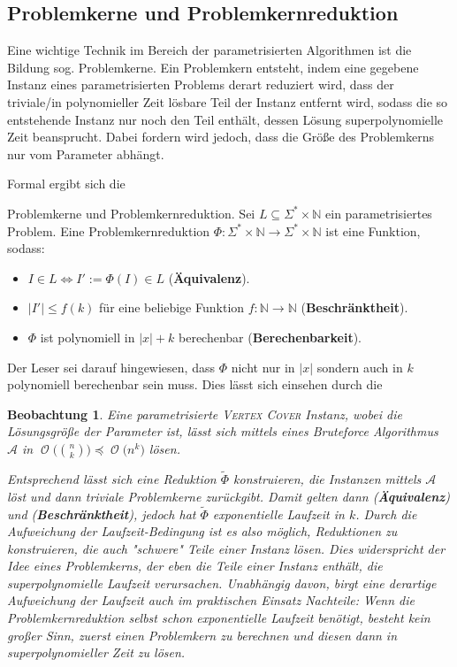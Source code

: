 \documentclass[a4paper,ngerman]{atseminar}
\newcommand{\N}{\ensuremath{\mathbb{N}}\xspace}
\newcommand{\BigO}[1]{\ensuremath{\operatorname{\mathcal{O}}\bigl(#1\bigr)}\xspace}
\newtheorem{observation}[theorem]{\textbf{Beobachtung}}
\begin{document}
\subsection{Problemkerne und Problemkernreduktion}

Eine wichtige Technik im Bereich der parametrisierten Algorithmen ist die Bildung sog. Problemkerne.
Ein Problemkern entsteht, indem eine gegebene Instanz eines parametrisierten Problems derart reduziert wird, dass der triviale/in polynomieller Zeit lösbare
Teil der Instanz entfernt wird, sodass die so entstehende Instanz nur noch den Teil enthält, dessen Lösung superpolynomielle Zeit beansprucht.
\noindent
Dabei fordern wird jedoch, dass die Größe des Problemkerns nur vom Parameter abhängt.

\noindent
Formal ergibt sich die

\begin{definition}{Problemkerne und Problemkernreduktion.}
  Sei $L  \subseteq \Sigma^* \times \N$ ein parametrisiertes Problem.
  Eine Problemkernreduktion $ \Phi: \Sigma^* \times \N \rightarrow \Sigma^* \times \N $ ist eine Funktion, sodass:
  \begin{itemize}
      \item $I \in L \iff I' := \Phi(I) \in L $ (\textbf{Äquivalenz}).
      \item $|I'| \leq f(k)$ für eine beliebige Funktion $f: \N \rightarrow \N$ (\textbf{Beschränktheit}).
      \item $\Phi$ ist polynomiell in $|x| + k$ berechenbar (\textbf{Berechenbarkeit}).
  \end{itemize}
\end{definition}

\noindent
Der Leser sei darauf hingewiesen, dass $\Phi$ nicht nur in $|x|$ sondern auch in $k$ polynomiell berechenbar sein muss.
Dies lässt sich einsehen durch die
\begin{observation}

  Eine parametrisierte \textsc{Vertex Cover} Instanz, wobei die Lösungsgröße der Parameter ist, lässt sich mittels eines
  Bruteforce Algorithmus $\mathcal{A}$ in $\BigO{\binom{n}{k}} \preceq \BigO{n^k}$ lösen.

  \noindent
  Entsprechend lässt sich eine Reduktion $\tilde{\Phi}$ konstruieren, die Instanzen mittels $\mathcal{A}$ löst und dann triviale
  Problemkerne zurückgibt.
  Damit gelten dann (\textbf{Äquivalenz}) und (\textbf{Beschränktheit}), jedoch hat $\tilde{\Phi}$ exponentielle Laufzeit in $k$.
  \noindent
  Durch die Aufweichung der Laufzeit-Bedingung ist es also möglich, Reduktionen zu konstruieren, die auch "schwere" Teile einer Instanz lösen.
  Dies widerspricht der Idee eines Problemkerns, der eben die Teile einer Instanz enthält, die superpolynomielle Laufzeit verursachen.
  Unabhängig davon, birgt eine derartige Aufweichung der Laufzeit auch im praktischen Einsatz Nachteile: Wenn die Problemkernreduktion selbst
  schon exponentielle Laufzeit benötigt, besteht kein großer Sinn, zuerst einen Problemkern zu berechnen und diesen dann in superpolynomieller Zeit
  zu lösen.
\end{observation}
\end{document}

